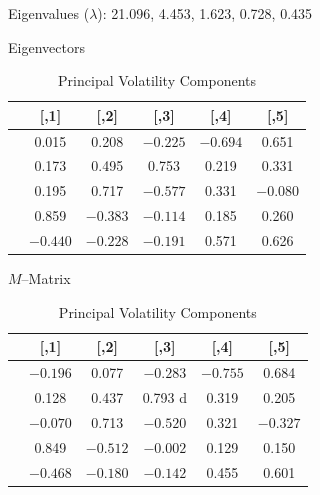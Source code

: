 	\begin{table}[H]
	\centering
	\caption{Principal Volatility Components \label{tab:pvctable}}
	Eigenvalues ($\lambda$): 21.096, 4.453, 1.623, 0.728, 0.435
	
	Eigenvectors
	
	\begin{tabular}{| l | c | c | c | c | c |} \hline
        &    [,1]   &    [,2]    &   [,3]    &   [,4]   &     [,5] \\ \hline
	[1,] & 0.015 & 0.208 & $-0.225$ & $-0.694$ &  0.651 \\ \hline
	[2,] & 0.173 & 0.495 & 0.753 & 0.219 & 0.331 \\ \hline
	[3,] & 0.195 & 0.717 & $-0.577$ & 0.331 & $-0.080$ \\ \hline
	[4,] & 0.859 & $-0.383$ & $-0.114$ & 0.185 & 0.260 \\ \hline
	[5,] & $-0.440$ & $-0.228$ & $-0.191$ & 0.571 & 0.626 \\
	\end{tabular}
	
	$M$--Matrix \\[0.1cm]
	
	\begin{tabular}{| l | c | c | c | c | c |} \hline
	         &   [,1]   &     [,2]    &     [,3]   &    [,4]   &    [,5] \\ \hline
	[1,] & $-0.196$ & 0.077 & $-0.283$ & $-0.755$ & 0.684 \\ \hline
	[2,] & 0.128 & 0.437 & 0.793 d & 0.319 & 0.205 \\ \hline
	[3,]& $-0.070$ & 0.713 & $-0.520$ & 0.321 & $-0.327$ \\ \hline
	[4,] & 0.849 & $-0.512$ & $-0.002$ & 0.129 & 0.150 \\ \hline
	[5,] & $-0.468$ & $-0.180$ & $-0.142$ & 0.455 & 0.601 \\
	\end{tabular}
	\end{table}




